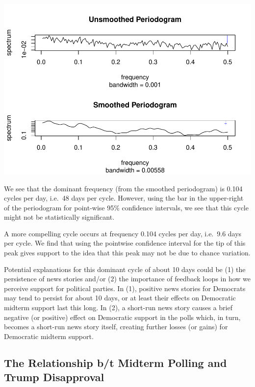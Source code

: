 \documentclass[]{article}
\begin{document}
\begin{center}\includegraphics{midterm_project_final_files/figure-latex/periodograms-1} \end{center}

We see that the dominant frequency (from the smoothed periodogram) is
0.104 cycles per day, i.e.~48 days per cycle. However, using the bar in
the upper-right of the periodogram for point-wise 95\% confidence
intervals, we see that this cycle might not be statistically
significant.

A more compelling cycle occurs at frequency 0.104 cycles per day,
i.e.~9.6 days per cycle. We find that using the pointwise confidence
interval for the tip of this peak gives support to the idea that this
peak may not be due to chance variation.

Potential explanations for this dominant cycle of about 10 days could be
(1) the persistence of news stories and/or (2) the importance of
feedback loops in how we perceive support for political parties. In (1),
positive news stories for Democrats may tend to persist for about 10
days, or at least their effects on Democratic midterm support last this
long. In (2), a short-run news story causes a brief negative (or
positive) effect on Democratic support in the polls which, in turn,
becomes a short-run news story itself, creating further losses (or
gains) for Democratic midterm support.

\subsection{The Relationship b/t Midterm Polling and Trump
Disapproval}\label{the-relationship-bt-midterm-polling-and-trump-disapproval}
\end{document}

